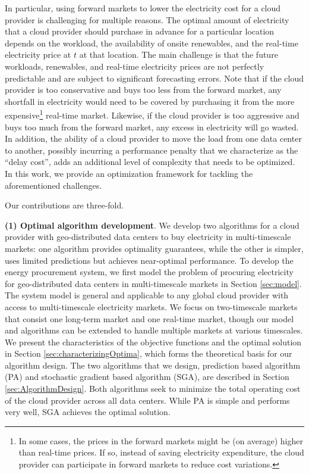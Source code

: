 In particular, using forward markets to lower the electricity cost for a cloud provider is challenging for multiple reasons. The optimal amount of electricity that a cloud provider should purchase in advance for a particular location  depends on the workload, the availability of onsite renewables, and the real-time electricity price at $t$ at that location. The main challenge is that the future workloads, renewables, and real-time electricity prices are not perfectly predictable and are subject to significant forecasting errors. Note that if the cloud provider is too conservative and buys too less from the forward market, any shortfall in electricity would need to be covered by purchasing it from the more expensive\footnote{In some cases, the prices in the forward markets might be (on average) higher than real-time prices. If so, instead of saving electricity expenditure, the cloud provider can participate in forward markets to reduce cost variations. } real-time market. Likewise, if the cloud provider is too aggressive and buys too much from the forward market, any excess in electricity will go wasted. In addition, the ability of a cloud provider to move the load from one data center to another, possibly incurring a performance penalty that we characterize as the ``delay cost'', adds an additional level of complexity that needs to be optimized. In this work, we provide an optimization framework for tackling the aforementioned challenges.


Our contributions are three-fold.

\textbf{(1) Optimal algorithm development}. We develop two algorithms for a cloud provider with geo-distributed data centers to buy electricity in multi-timescale markets: one algorithm provides optimality guarantees, while the other is simpler, uses limited predictions but achieves near-optimal performance.
To develop the energy procurement system, we first model the problem of procuring electricity for geo-distributed data centers in multi-timescale markets in Section \ref{sec:model}. The system model is general and applicable to any global cloud provider with access to multi-timescale electricity markets. We focus on two-timescale markets that consist one long-term market and one real-time market, though our model and algorithms can be extended to handle multiple markets at various timescales. We present the characteristics of the objective functions and the optimal solution in Section \ref{sec:characterizingOptima}, which forms the theoretical basis for our algorithm design. The two algorithms that we design, prediction based algorithm (PA) and stochastic gradient based algorithm (SGA), are described in Section \ref{sec:AlgorithmDesign}. Both algorithms seek to minimize the total operating cost of the cloud provider across all data centers. While PA is simple and performs very well, SGA achieves the optimal solution. 

